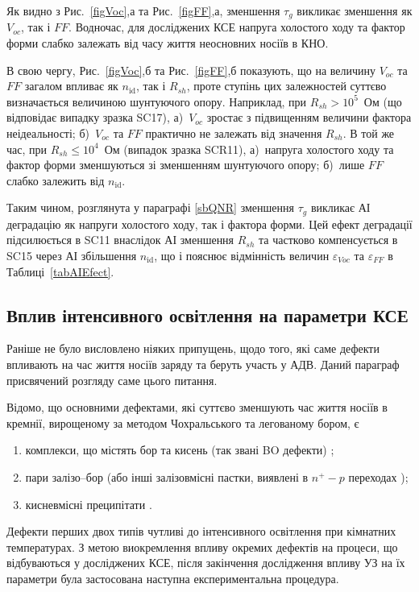 Як видно з Рис.~\ref{figVoc},а та Рис.~\ref{figFF},а, зменшення $\tau_g$ викликає зменшення як $V_{oc}$, так і $F\!F$.
Водночас, для досліджених КСЕ напруга холостого ходу та фактор форми слабко залежать від
часу життя неосновних носіїв в КНО.

В свою чергу, Рис.~\ref{figVoc},б та Рис.~\ref{figFF},б показують,
що на величину $V_{oc}$ та $F\!F$ загалом впливає як $n_\mathrm{id}$, так і $R_{sh}$,
проте ступінь цих залежностей суттєво визначається величиною шунтуючого опору.
Наприклад, при $R_{sh}>10^5$~Ом (що відповідає випадку зразка SC17),
а)~$V_{oc}$ зростає з підвищенням величини фактора неідеальності;
б)~$V_{oc}$ та $FF$ практично не залежать від значення $R_{sh}$.
В той же час, при $R_{sh}\leq10^4$~Ом (випадок зразка SCR11),
а)~напруга холостого ходу та фактор форми зменшуються зі зменшенням шунтуючого опору;
б)~лише $F\!F$ слабко залежить від $n_\mathrm{id}$.

Таким чином, розглянута у параграфі \ref{sbQNR} зменшення $\tau_g$ викликає АІ деградацію як напруги
холостого ходу, так і фактора форми.
Цей ефект деградації підсилюється в SC11 внаслідок АІ зменшення $R_{sh}$ та частково компенсується в SC15
через АІ збільшення $n_\mathrm{id}$, що і пояснює відмінність величин $\varepsilon_{Voc}$ та $\varepsilon_{FF}$ в Таблиці~\ref{tabAIEfect}.




\subsection{Вплив інтенсивного освітлення на параметри КСЕ\label{sbDefectType}}
Раніше не було висловлено ніяких припущень, щодо того, які саме дефекти впливають на час життя
носіїв заряду та беруть участь у АДВ.
Даний параграф присвячений розгляду саме цього питання.

Відомо, що основними дефектами, які суттєво зменшують час життя носіїв в кремнії, вирощеному
за методом Чохральського та легованому бором, є
\begin{enumerate}[label=\asbuk*),leftmargin=0em,itemindent=1.5em]
\item  комплекси, що містять бор та кисень (так звані BO дефекти) \cite{LIDRev,LIDRev2};
\item пари залізо--бор \cite{MurphyJAP2011,FeB:Vahanissi,FeB:Schmidt} (або інші залізовмісні пастки, виявлені в $n^+-p$ переходах \cite{TeimurazPSS,TeimurazJAP});
\item кисневмісні преципітати \cite{MurphySC2014,Oxide_Schon,MurphyJAP2011,MurphyJAP2012,Oxide:Chen,Oxide:Porrini}.
\end{enumerate}
Дефекти перших двох типів чутливі до інтенсивного освітлення при кімнатних температурах.
З метою виокремлення впливу окремих дефектів на процеси, що відбуваються у досліджених КСЕ,
після закінчення дослідження впливу УЗ на їх параметри
була застосована наступна експериментальна процедура.

